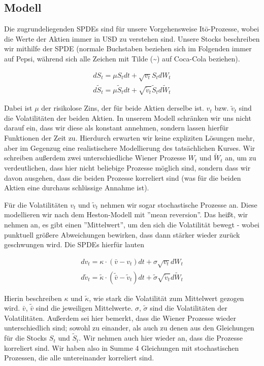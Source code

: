 \documentclass[12pt]{article}
\begin{document}
\subsection{Modell}

Die zugrundeliegenden SPDEs sind für unsere Vorgehensweise It\={o}-Prozesse, wobei die Werte der Aktien immer in USD zu verstehen sind. Unsere Stocks beschreiben wir mithilfe der SPDE (normale Buchstaben beziehen sich im Folgenden immer auf Pepsi, während sich alle Zeichen mit Tilde (\~{}) auf Coca-Cola beziehen).

\begin{align}\label{SPDEstock}
dS_t = \mu S_t dt + \sqrt{v_t} S_t dW_t \\
d\tilde{S}_t = \mu \tilde{S}_t dt + \sqrt{\tilde{v}_t} \tilde{S}_t d\tilde{W}_t
\end{align}

Dabei ist $\mu$ der risikolose Zins, der für beide Aktien derselbe ist. $v_t$ bzw. $\tilde{v}_t$ sind die Volatilitäten der beiden Aktien. In unserem Modell schränken wir uns nicht darauf ein, dass wir diese als konstant annehmen, sondern lassen hierfür Funktionen der Zeit zu. Hierdurch erwarten wir keine expliziten Lösungen mehr, aber im Gegenzug eine realistischere Modellierung des tatsächlichen Kurses. Wir schreiben außerdem zwei unterschiedliche Wiener Prozesse $W_t$ und $\tilde{W}_t$ an, um zu verdeutlichen, dass hier nicht beliebige Prozesse möglich sind, sondern dass wir davon ausgehen, dass die beiden Prozesse korreliert sind (was für die beiden Aktien eine durchaus schlüssige Annahme ist).

Für die Volatilitäten $v_t$ und $\tilde{v}_t$ nehmen wir sogar stochastische Prozesse an. Diese modellieren wir nach dem Heston-Modell mit ''mean reversion''. Das heißt, wir nehmen an, es gibt einen ''Mittelwert'', um den sich die Volatilität bewegt - wobei punktuell größere Abweichungen bewirken, dass dann stärker wieder zurück geschwungen wird. Die SPDEs hierfür lauten

\begin{align} \label{SPDEvol}
dv_t = \kappa\cdot(\bar{v}-v_t) dt + \sigma \sqrt{v_t}dW_t \\
d\tilde{v}_t = \tilde{\kappa}\cdot(\tilde{\bar{v}}-\tilde{v}_t) dt + \tilde{\sigma} \sqrt{\tilde{v}_t}d\tilde{W}_t
\end{align}

Hierin beschreiben $\kappa$ und $\tilde{\kappa}$, wie stark die Volatilität zum Mittelwert gezogen wird. $\bar{v}$, $\tilde{\bar{v}}$ sind die jeweiligen Mittelwerte. $\sigma$, $\tilde{\sigma}$ sind die Volatilitäten der Volatilitäten. Außerdem sei hier bemerkt, dass die Wiener Prozesse wieder unterschiedlich sind; sowohl zu einander, als auch zu denen aus den Gleichungen für die Stocks $S_t$ und $\tilde{S}_t$. Wir nehmen auch hier wieder an, dass die Prozesse korreliert sind. Wir haben also in Summe 4 Gleichungen mit stochastischen Prozessen, die alle untereinander korreliert sind.
\end{document}
